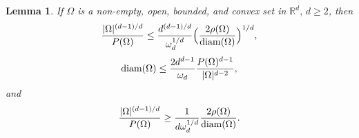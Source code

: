 \documentclass[a4paper,9pt]{article}
\newcommand{\R}{\mathbb{R}}
\newtheorem{lemma}[theorem]{Lemma}
\newcommand{\Om}{\Omega}
\begin{document}
\begin{lemma}\label{lem1} If $\Omega$ is a non-empty, open, bounded, and convex set in $\R^d,\,d\ge 2$, then
\begin{equation}\label{e61a}
\frac{|\Om|^{(d-1)/d}}{P(\Om)}\le \frac{d^{(d-1)/d}}{\omega^{1/d}_d}\Big(\frac{2\rho(\Om)}{\textup{diam}(\Om)}\Big)^{1/d},
\end{equation}
\begin{equation}\label{e61d}
\textup{diam}(\Om)\le \frac{2d^{d-1}}{\omega_d}\frac{P(\Om)^{d-1}}{|\Om|^{d-2}},
\end{equation}
and
\begin{equation}\label{e61aa}
\frac{|\Om|^{(d-1)/d}}{P(\Om)}\ge \frac{1}{d\omega_d^{1/d}}\frac{2\rho(\Om)}{\textup{diam}(\Om)}.
\end{equation}
\end{lemma}
\end{document}
